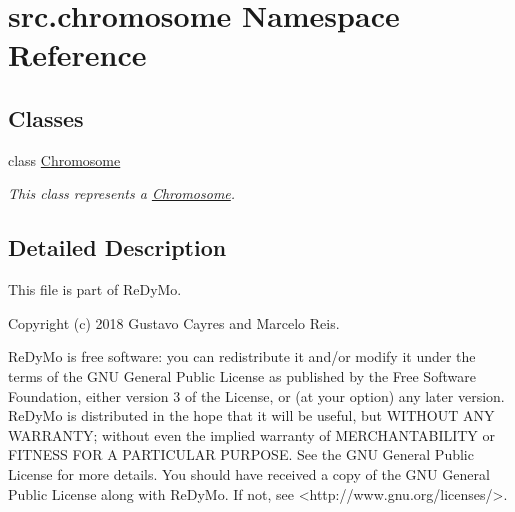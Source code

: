 \hypertarget{namespacesrc_1_1chromosome}{}\section{src.\+chromosome Namespace Reference}
\label{namespacesrc_1_1chromosome}
\subsection*{Classes}
\begin{DoxyCompactItemize}
\item 
class \mbox{\hyperlink{classsrc_1_1chromosome_1_1Chromosome}{Chromosome}}
\begin{DoxyCompactList}\small\item\em This class represents a \mbox{\hyperlink{classsrc_1_1chromosome_1_1Chromosome}{Chromosome}}. \end{DoxyCompactList}\end{DoxyCompactItemize}


\subsection{Detailed Description}
\begin{DoxyVerb}This file is part of ReDyMo.

    Copyright (c) 2018  Gustavo Cayres and Marcelo Reis.

    ReDyMo is free software: you can redistribute it and/or modify it
    under the terms of the GNU General Public License as published by the
    Free Software Foundation, either version 3 of the License, or (at your
    option) any later version.
    ReDyMo is distributed in the hope that it will be useful, but WITHOUT
    ANY WARRANTY; without even the implied warranty of MERCHANTABILITY or
    FITNESS FOR A PARTICULAR PURPOSE. See the GNU General Public License
    for more details.
    You should have received a copy of the GNU General Public License along
    with ReDyMo. If not, see <http://www.gnu.org/licenses/>.
\end{DoxyVerb}
 